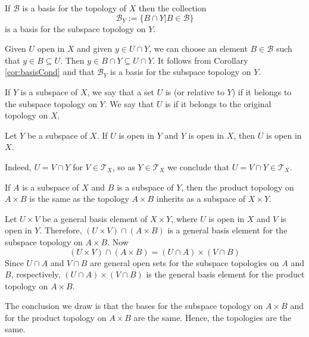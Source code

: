 \documentclass[12pt, a4paper, twoside, openright, titlepage]{book}
\begin{document}
\begin{lem}{}{}
    If $\mathcal{B}$ is a basis for the topology of $X$ then the collection \begin{equation*}
        \mathcal{B}_Y := \{B\cap Y\vert B \in \mathcal{B}\}
    \end{equation*}
    is a basis for the subspace topology on $Y$.
\end{lem}
\begin{proof*}{}{}
    Given $U$ open in $X$ and given $y \in U\cap Y$, we can choose an element $B \in \mathcal{B}$ such that $y \in B\subseteq U$. Then $y \in B\cap Y \subseteq U\cap Y$. It follows from Corollary \ref{cor:basisCond} and that $\mathcal{B}_Y$ is a basis for the subspace topology on $Y$. 
\end{proof*}


\begin{defn}{}{}
    If $Y$ is a subspace of $X$, we say that a set $U$ is  (or relative to $Y$) if it belongs to the subspace topology on $Y$. We say that $U$ is  if it belongs to the original topology on $X$.
\end{defn}


\begin{lem}{}{}
    Let $Y$ be a subspace of $X$. If $U$ is open in $Y$ and $Y$ is open in $X$, then $U$ is open in $X$.
\end{lem}
\begin{proof*}{}{}
    Indeed, $U = V\cap Y$ for $V \in \mathcal{T}_X$, so as $Y \in \mathcal{T}_X$ we conclude that $U = V\cap Y \in \mathcal{T}_X$.
\end{proof*}

\begin{thm}{}{}
    If $A$ is a subspace of $X$ and $B$ is a subspace of $Y$, then the product topology on $A\times B$ is the same as the topology $A\times B$ inherits as a subspace of $X\times Y$.
\end{thm}
\begin{proof*}{}{}
    Let $U\times V$ be a general basis element of $X\times Y$, where $U$ is open in $X$ and $V$ is open in $Y$. Therefore, $(U\times V)\cap(A\times B)$ is a general basis element for the subspace topology on $A\times B$. Now \begin{equation*}
        (U\times V)\cap (A\times B) = (U\cap A)\times (V\cap B)
    \end{equation*}
    Since $U\cap A$ and $V\cap B$ are general open sets for the subspace topologies on $A$ and $B$, respectively, $(U\cap A)\times (V\cap B)$ is the general basis element for the product topology on $A\times B$.

    The conclusion we draw is that the bases for the subspace topology on $A\times B$ and for the product topology on $A\times B$ are the same. Hence, the topologies are the same.
\end{proof*}
\end{document}
